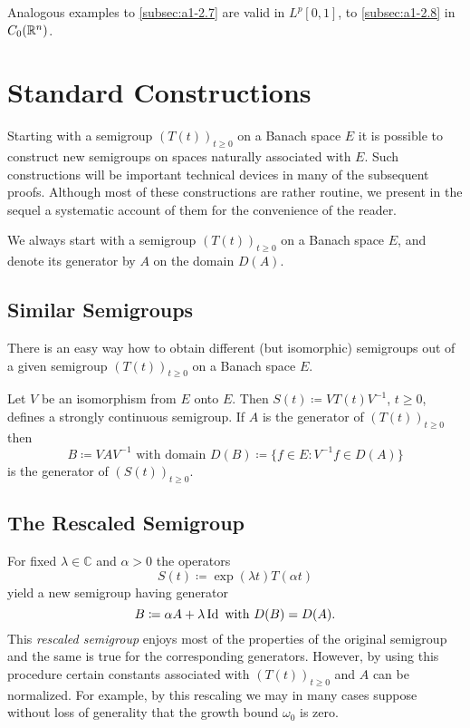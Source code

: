 Analogous examples to \ref{subsec:a1-2.7} are valid in $L^{p}\left[ 0,1 \right]$, \resp to 
\ref{subsec:a1-2.8} in $C_{0}(\mathbb{R}^{n})$.
\section{Standard Constructions}\label{sec:a1-3}
Starting with a semigroup $(T(t))_{t \geq 0}$ on a Banach space $E$ it is possible to construct new semigroups on spaces naturally associated with $E$.
Such constructions will be important technical devices in many of the subsequent proofs.
Although most of these constructions are rather routine, we present in the sequel a systematic account of them for the convenience of the reader.

We always start with a semigroup $(T(t))_{t \geq 0}$ on a Banach space $E$, and denote its generator by $A$ on the domain $D(A)$.
\subsection{Similar Semigroups}\label{subsec:a1-3.0}
There is an easy way how to obtain different (but isomorphic) 
semigroups out of a given semigroup $(T(t))_{t \geq 0}$ on a Banach space $E$.

Let $V$ be an isomorphism from $E$ onto $E$.
Then $S(t) \coloneqq VT(t)V^{-1}$, $t \geq 0$, defines a strongly continuous semigroup.
If $A$ is the generator of $(T(t))_{t \geq 0}$ then
\[
    B \coloneqq VAV^{-1} \text{ with domain } D(B) \coloneqq \{f \in E \colon V^{-1}f \in D(A)\}
\]
is the generator of $(S(t))_{t \geq 0}$.
\subsection{The Rescaled Semigroup}\label{subsec:a1-3.1}
For fixed $\lambda \in \mathbb{C}$ and $\alpha > 0$ the operators
\[
    S(t) \coloneqq \exp(\lambda t)T(\alpha t)
\]
yield a new semigroup having generator
\[
    B \coloneqq \alpha A + \lambda \operatorname{Id} \text{ with } D(B) = D(A) .
\]
This \emph{rescaled semigroup} enjoys most of the properties of the original semigroup and the same is true for the corresponding generators.
However, by using this procedure certain constants associated with $(T(t))_{t \geq 0}$ and $A$ can be normalized.
For example, by this rescaling we may in many cases suppose without loss of generality that the growth bound $\omega_{0}$ is zero.

